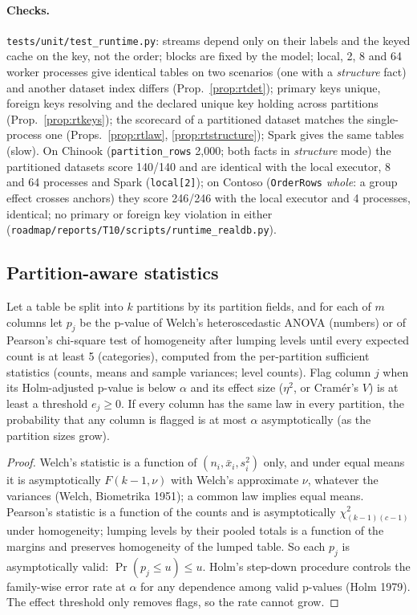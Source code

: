 \paragraph{Checks.} \texttt{tests/unit/test\_runtime.py}: streams depend only on their labels and the keyed cache on the key, not the order; blocks are fixed by the model; local, 2, 8 and 64 worker processes give identical tables on two scenarios (one with a \emph{structure} fact) and another dataset index differs (Prop.~\ref{prop:rtdet}); primary keys unique, foreign keys resolving and the declared unique key holding across partitions (Prop.~\ref{prop:rtkeys}); the scorecard of a partitioned dataset matches the single-process one (Props.~\ref{prop:rtlaw}, \ref{prop:rtstructure}); Spark gives the same tables (slow). On Chinook (\texttt{partition\_rows} 2{,}000; both facts in \emph{structure} mode) the partitioned datasets score 140/140 and are identical with the local executor, 8 and 64 processes and Spark (\texttt{local[2]}); on Contoso (\texttt{OrderRows} \emph{whole}: a group effect crosses anchors) they score 246/246 with the local executor and 4 processes, identical; no primary or foreign key violation in either (\texttt{roadmap/reports/T10/scripts/runtime\_realdb.py}).

\subsection{Partition-aware statistics}

\begin{proposition}\label{prop:rtdrift}
Let a table be split into $k$ partitions by its partition fields, and for each of $m$ columns let $p_j$ be the p-value of Welch's heteroscedastic ANOVA (numbers) or of Pearson's chi-square test of homogeneity after lumping levels until every expected count is at least 5 (categories), computed from the per-partition sufficient statistics (counts, means and sample variances; level counts). Flag column $j$ when its Holm-adjusted p-value is below $\alpha$ and its effect size ($\eta^2$, or Cramér's $V$) is at least a threshold $e_j\ge 0$. If every column has the same law in every partition, the probability that any column is flagged is at most $\alpha$ asymptotically (as the partition sizes grow).
\end{proposition}
\begin{proof}
Welch's statistic is a function of $(n_i,\bar x_i,s_i^2)$ only, and under equal means it is asymptotically $F(k-1,\nu)$ with Welch's approximate $\nu$, whatever the variances (Welch, Biometrika 1951); a common law implies equal means. Pearson's statistic is a function of the counts and is asymptotically $\chi^2_{(k-1)(c-1)}$ under homogeneity; lumping levels by their pooled totals is a function of the margins and preserves homogeneity of the lumped table. So each $p_j$ is asymptotically valid: $\Pr(p_j\le u)\le u$. Holm's step-down procedure controls the family-wise error rate at $\alpha$ for any dependence among valid p-values (Holm 1979). The effect threshold only removes flags, so the rate cannot grow.
\end{proof}

